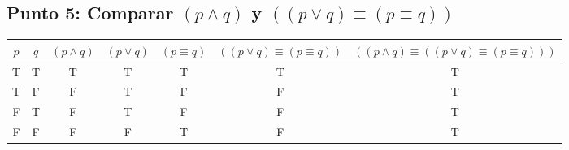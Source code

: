 \documentclass{article}
\begin{document}
\subsection{Punto 5: Comparar $(p \wedge q)$ y $((p \vee q) \equiv (p \equiv q))$}
\begin{center}
    \begin{NiceTabular}{|c|c|c|c|c|c|c|}
        \hline
        $p$ & $q$ & $(p\wedge q)$ & $(p\vee q)$ & $(p\equiv q)$ & $((p \vee q) \equiv (p \equiv q))$ & $((p\wedge q) \equiv ((p \vee q) \equiv (p \equiv q)))$\\
        \hline
        \ttfamily T & \ttfamily T & \ttfamily T & \ttfamily T & \ttfamily T & \ttfamily T & \ttfamily T\\
        \ttfamily T & \ttfamily F & \ttfamily F & \ttfamily T & \ttfamily F & \ttfamily F & \ttfamily T\\
        \ttfamily F & \ttfamily T & \ttfamily F & \ttfamily T & \ttfamily F & \ttfamily F & \ttfamily T\\
        \ttfamily F & \ttfamily F & \ttfamily F & \ttfamily F & \ttfamily T & \ttfamily F & \ttfamily T\\
        \hline
    \end{NiceTabular}
\end{center}
\end{document}
